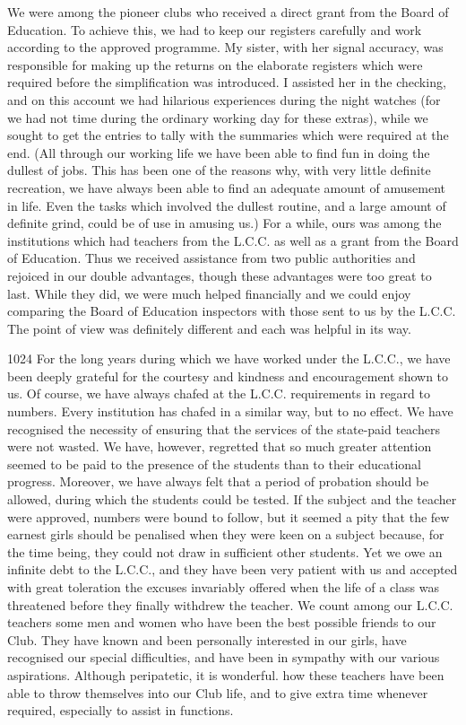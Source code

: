 We were among the pioneer clubs who received a
direct grant from the Board of Education. To achieve
this, we had to keep our registers carefully and work
according to the approved programme. My sister, with
her signal accuracy, was responsible for making up the
returns on the elaborate registers which were required
before the simplification was introduced. I assisted her in
the checking, and on this account we had hilarious
experiences during the night watches (for we had not time
during the ordinary working day for these extras), while we
sought to get the entries to tally with the summaries which
were required at the end. (All through our working life
we have been able to find fun in doing the dullest of jobs.
This has been one of the reasons why, with very little
definite recreation, we have always been able to find
an adequate amount of amusement in life. Even the tasks
which involved the dullest routine, and a large amount of
definite grind, could be of use in amusing us.) For a while,
ours was among the institutions which had teachers from
the L.C.C. as well as a grant from the Board of Education.
Thus we received assistance from two public
authorities and rejoiced in our double advantages, though
these advantages were too great to last. While they did,
we were much helped financially and we could enjoy
comparing the Board of Education inspectors with those
sent to us by the L.C.C\@. The point of view was definitely
different and each was helpful in its way.

\begin{tp}{1024}
For the long years during which we have worked under
the L.C.C., we have been deeply grateful for the courtesy
and kindness and encouragement shown to us. Of course,
we have always chafed at the L.C.C. requirements in
regard to numbers. Every institution has chafed in a
similar way, but to no effect. We have recognised the
necessity of ensuring that the services of the state-paid
teachers were not wasted. We have, however, regretted
that so much greater attention seemed to be paid to the
presence of the students than to their educational progress.
Moreover, we have always felt that a period of probation
should be allowed, during which the students could be
tested. If the subject and the teacher were approved,
numbers were bound to follow, but it seemed a pity that
the few earnest girls should be penalised when they were
keen on a subject because, for the time being, they could
not draw in sufficient other students. Yet we owe an
infinite debt to the L.C.C., and they have been very patient
with us and accepted with great toleration the excuses
invariably offered when the life of a class was threatened
before they finally withdrew the teacher. We count
among our L.C.C. teachers some men and women who
have been the best possible friends to our Club. They
have known and been personally interested in our girls,
have recognised our special difficulties, and have been in
sympathy with our various aspirations. Although
peripatetic, it is wonderful. how these teachers have been
able to throw themselves into our Club life, and to give
extra time whenever required, especially to assist in
functions.
\end{tp}

